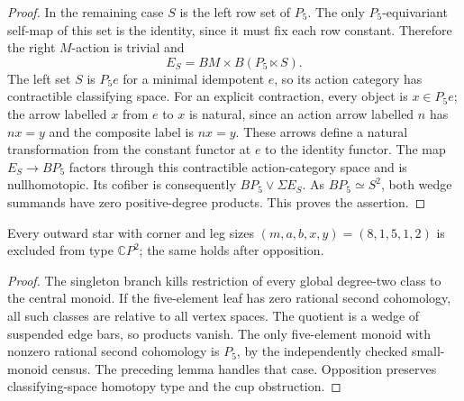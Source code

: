 \begin{proof}
In the remaining case $S$ is the left row set of $P_5$.
The only $P_5$-equivariant self-map of this set is the
identity, since it must fix each row constant. Therefore
the right $M$-action is trivial and
\[
 E_S=BM\times B(P_5\ltimes S).
\]
The left set $S$ is $P_5e$ for a minimal idempotent $e$,
so its action category has contractible classifying space.
For an explicit contraction, every object is $x\in P_5e$;
the arrow labelled $x$ from $e$ to $x$ is natural, since
an action arrow labelled $n$ has $nx=y$ and the composite
label is $nx=y$. These arrows define a natural transformation
from the constant functor at $e$ to the identity functor.
The map $E_S\to BP_5$ factors through this contractible
action-category space and is nullhomotopic. Its cofiber
is consequently $BP_5\vee\Sigma E_S$.
As $BP_5\simeq S^2$, both wedge summands have zero
positive-degree products. This proves the assertion.
\end{proof}

\begin{corollary}\label{C:star-eight-one-five-singleton-two}
Every outward star with corner and leg sizes
$(m,a,b,x,y)=(8,1,5,1,2)$ is excluded from type
$\mathbb CP^2$; the same holds after opposition.
\end{corollary}
\begin{proof}
The singleton branch kills restriction of every global
degree-two class to the central monoid. If the five-element
leaf has zero rational second cohomology, all such classes
are relative to all vertex spaces. The quotient is a wedge
of suspended edge bars, so products vanish. The only
five-element monoid with nonzero rational second cohomology
is $P_5$, by the independently checked small-monoid census.
The preceding lemma handles that case. Opposition preserves
classifying-space homotopy type and the cup obstruction.
\end{proof}

